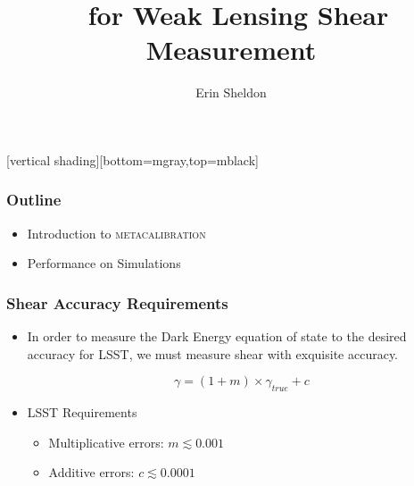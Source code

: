 \documentclass{beamer}
\title{\Mcal\ for Weak Lensing Shear Measurement}
\author{Erin Sheldon}
\institute{Brookhaven National Laboratory}
\newcommand{\mcal}{\textsc{metacalibration}}
\begin{document}
\frame{\titlepage}


[vertical shading][bottom=mgray,top=mblack]

\frame
{
    \frametitle{Outline}

 
    \begin{itemize}

        \item Introduction to \mcal
        \item Performance on Simulations

    \end{itemize}

}

\frame
{
    \frametitle{Shear Accuracy Requirements}

 
    \begin{itemize}

        \item In order to measure the Dark Energy equation of state
            to the desired accuracy for LSST, we must measure
            shear with exquisite accuracy.

            {\color{lightskyblue}
                \begin{equation}
                    \gamma = (1 + m ) \times \gamma_{true} + c \nonumber
                \end{equation}
            } 

        \item LSST Requirements
            \begin{itemize}
                \item Multiplicative errors: {\color{gold} $m \lesssim 0.001$}
                \item Additive errors: {\color{brightred} $c \lesssim 0.0001$}
            \end{itemize}


    \end{itemize}

}
\end{document}
